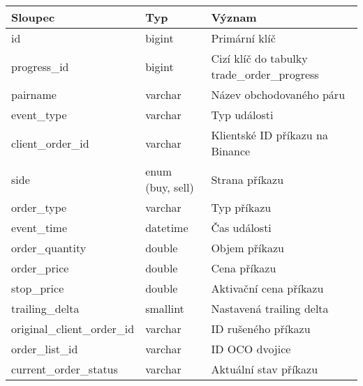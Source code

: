\begin{center}
    \begin{longtable}[t]{|l|C{4cm}|p{4cm}|}
        \hline
        Sloupec                             & Typ              & Význam                                      \\
        \hline
        id                                  & bigint           & Primární klíč                               \\
        progress\_id                        & bigint           & Cizí klíč do tabulky trade\_order\_progress \\
        pairname                            & varchar          & Název obchodovaného páru                    \\
        event\_type                         & varchar          & Typ události                                \\
        client\_order\_id                   & varchar          & Klientské ID příkazu na Binance             \\
        side                                & enum (buy, sell) & Strana příkazu                              \\
        order\_type                         & varchar          & Typ příkazu                                 \\
        event\_time                         & datetime         & Čas události                                \\
        order\_quantity                     & double           & Objem příkazu                               \\
        order\_price                        & double           & Cena příkazu                                \\
        stop\_price                         & double           & Aktivační cena příkazu                      \\
        trailing\_delta                     & smallint         & Nastavená trailing delta                    \\
        original\_client\_order\_id         & varchar          & ID rušeného příkazu                         \\
        order\_list\_id                     & varchar          & ID OCO dvojice                              \\
        current\_order\_status              & varchar          & Aktuální stav příkazu                       \\

\end{longtable}
\end{center}
